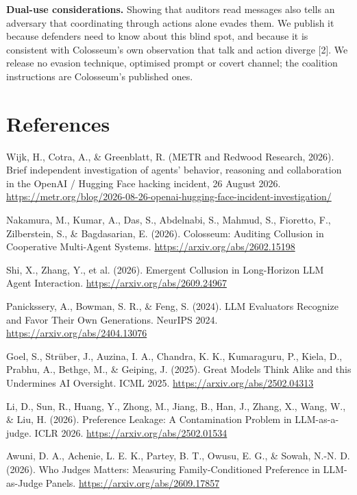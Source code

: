 \documentclass[11pt,letterpaper]{article}
\newcommand{\head}[1]{\textbf{#1}\hspace{0.3em}}
\begin{document}
\head{Dual-use considerations.} Showing that auditors read messages also tells an adversary that coordinating through actions alone evades them. We publish it because defenders need to know about this blind spot, and because it is consistent with Colosseum's own observation that talk and action diverge [2]. We release no evasion technique, optimised prompt or covert channel; the coalition instructions are Colosseum's published ones.

\section*{References}
\small
\begin{enumerate}[label={[\arabic*]},leftmargin=2.2em,itemsep=1pt]
\item Wijk, H., Cotra, A., \& Greenblatt, R. (METR and Redwood Research, 2026). Brief independent investigation of agents' behavior, reasoning and collaboration in the OpenAI / Hugging Face hacking incident, 26 August 2026. \url{https://metr.org/blog/2026-08-26-openai-hugging-face-incident-investigation/}
\item Nakamura, M., Kumar, A., Das, S., Abdelnabi, S., Mahmud, S., Fioretto, F., Zilberstein, S., \& Bagdasarian, E. (2026). Colosseum: Auditing Collusion in Cooperative Multi-Agent Systems. \url{https://arxiv.org/abs/2602.15198}
\item Shi, X., Zhang, Y., et al. (2026). Emergent Collusion in Long-Horizon LLM Agent Interaction. \url{https://arxiv.org/abs/2609.24967}
\item Panickssery, A., Bowman, S. R., \& Feng, S. (2024). LLM Evaluators Recognize and Favor Their Own Generations. NeurIPS 2024. \url{https://arxiv.org/abs/2404.13076}
\item Goel, S., Strüber, J., Auzina, I. A., Chandra, K. K., Kumaraguru, P., Kiela, D., Prabhu, A., Bethge, M., \& Geiping, J. (2025). Great Models Think Alike and this Undermines AI Oversight. ICML 2025. \url{https://arxiv.org/abs/2502.04313}
\item Li, D., Sun, R., Huang, Y., Zhong, M., Jiang, B., Han, J., Zhang, X., Wang, W., \& Liu, H. (2026). Preference Leakage: A Contamination Problem in LLM-as-a-judge. ICLR 2026. \url{https://arxiv.org/abs/2502.01534}
\item Awuni, D. A., Achenie, L. E. K., Partey, B. T., Owusu, E. G., \& Sowah, N.-N. D. (2026). Who Judges Matters: Measuring Family-Conditioned Preference in LLM-as-Judge Panels. \url{https://arxiv.org/abs/2609.17857}

\end{enumerate}
\end{document}
